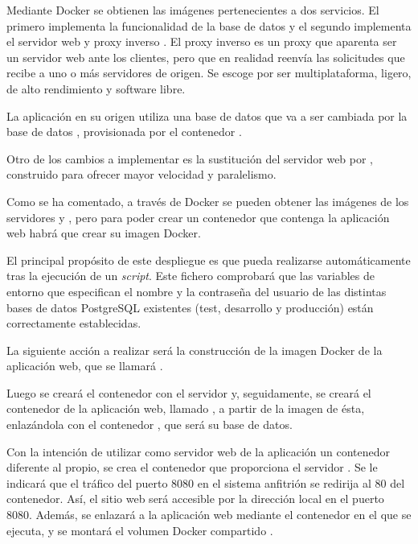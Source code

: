 Mediante Docker se obtienen las imágenes pertenecientes a dos servicios. El primero implementa la funcionalidad de la base de datos  y el segundo implementa el servidor web y proxy inverso . El proxy inverso es un proxy que aparenta ser un servidor web ante los clientes, pero que en realidad reenvía las solicitudes que recibe a uno o más servidores de origen. Se escoge  por ser multiplataforma, ligero, de alto rendimiento y software libre.

La aplicación en su origen utiliza una base de datos  que va a ser cambiada por la base de datos , provisionada por el contenedor . 

Otro de los cambios a implementar es la sustitución del servidor web  por , construido para ofrecer mayor velocidad y paralelismo.

Como se ha comentado, a través de Docker se pueden obtener las imágenes de los servidores  y , pero para poder crear un contenedor que contenga la aplicación web habrá que crear su imagen Docker. 

El principal propósito de este despliegue es que pueda realizarse automáticamente tras la ejecución de un \textit{script}. Este fichero comprobará que las variables de entorno que especifican el nombre y la contraseña del usuario de las distintas bases de datos PostgreSQL existentes (test, desarrollo y producción) están correctamente establecidas.

La siguiente acción a realizar será la construcción de la imagen Docker de la aplicación web, que se llamará . 

Luego se creará el contenedor  con el servidor  y, seguidamente, se creará el contenedor de la aplicación web, llamado , a partir de la imagen de ésta, enlazándola con el contenedor , que será su base de datos.

Con la intención de utilizar como servidor web de la aplicación un contenedor diferente al propio, se crea el contenedor  que proporciona el servidor . Se le indicará que el tráfico del puerto 8080 en el sistema anfitrión se redirija al 80 del contenedor. Así, el sitio web será accesible por la dirección local en el puerto 8080. Además, se enlazará a la aplicación web mediante el contenedor en el que se ejecuta, y se montará el volumen Docker compartido .

